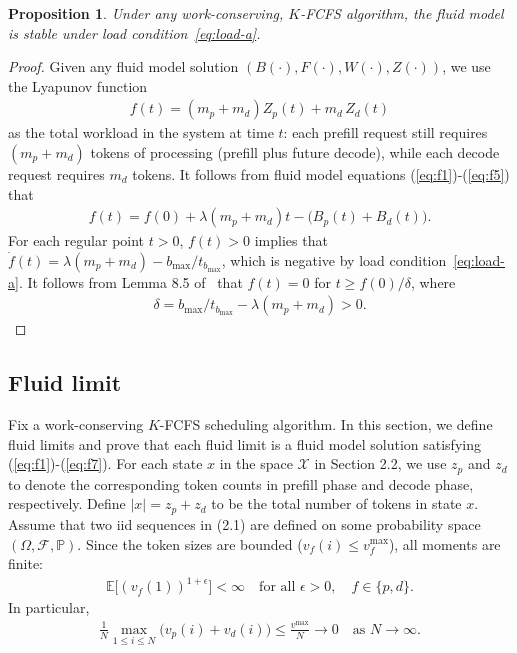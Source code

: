 \documentclass[11pt]{article}
\theoremstyle{plain}
\newtheorem{proposition}[theorem]{Proposition}
\theoremstyle{definition}
\theoremstyle{remark}
\newcommand{\E}{\mathbb{E}}
\providecommand{\abs}[1]{\lvert#1\rvert}
\begin{document}
\begin{proposition}\label{pro:1}
  Under any work-conserving, $K$-FCFS algorithm, the fluid
  model is stable under load condition~\cref{eq:load-a}.
\end{proposition}
\begin{proof}
  Given any fluid model solution $(B(\cdot), F(\cdot), W(\cdot),Z(\cdot))$,
  we use the Lyapunov function
  \begin{align}
    \label{eq:laypunov}
    f(t) = (m_p+m_d) Z_p(t) + m_d\, Z_d(t)
  \end{align}
  as the total workload in the system at time $t$: each prefill request still requires $(m_p+m_d)$ tokens of processing (prefill plus future decode), while each decode request requires $m_d$ tokens.
    It follows from fluid model equations (\ref{eq:f1})-(\ref{eq:f5}) that
  \begin{align*}
    f(t) = f(0) + \lambda (m_p+m_d) t - \big(B_p(t)+B_d(t)\big).
  \end{align*}
For each regular point $t>0$, $f(t)>0$ implies that
  $\dot f(t)=\lambda(m_p+m_d)-b_{\max}/t_{b_{\max}}$, which is negative by load condition~\cref{eq:load-a}. It follows from Lemma 8.5 of~\citep{dai2020processing} that $f(t)=0$ for $t\ge f(0)/\delta$, where
  \begin{align*}
    \delta = b_{\max}/t_{b_{\max}} - \lambda(m_p+m_d)>0.
  \end{align*}
\end{proof}


\subsection{Fluid limit}
\label{sec:limit}
Fix a work-conserving $K$-FCFS scheduling algorithm.
In this section, we define fluid limits and prove that each fluid limit
is a fluid model solution satisfying (\ref{eq:f1})-(\ref{eq:f7}).  For
each state $x$ in the space $\mathcal{X}$ in Section 2.2, we use $z_p$
and $z_d$ to denote the corresponding token counts in prefill phase
and decode phase, respectively. Define $\abs{x}=z_p+z_d$ to be the total
number of tokens in state $x$.  Assume that two iid sequences in
(2.1) are defined on some probability space
$(\Omega, \mathcal{F}, \mathbb{P})$. Since the token sizes are bounded ($v_f(i)\le v_f^{\max}$), all moments are finite:
\begin{align}
  \label{eq:m1+}
  \E\Big[(v_f(1))^{1+\epsilon}\Big]<\infty \quad \text{for all } \epsilon>0,\quad f\in \{p, d\}.
\end{align}
In particular,
\begin{align}\label{eq:vmax}
  \frac{1}{N} \max_{1\le i\le N}\big(v_p(i)+v_d(i)\big) \le \frac{v^{\max}}{N} \to 0 \quad \text{as } N\to\infty.
\end{align}
\end{document}
